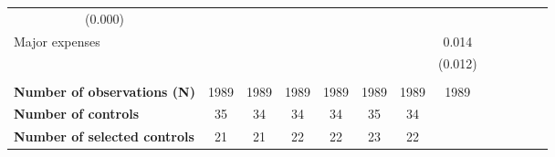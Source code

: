 \begin{center}
\begin{table}[th]
{\begin{tabular}{lcccccccccccc}
  \multicolumn{1}{c}{(0.000)} \\
\multicolumn{1}{l}{Major expenses} &
  \multicolumn{1}{c}{} &
  \multicolumn{1}{c}{} &
  \multicolumn{1}{c}{} &
  \multicolumn{1}{c}{} &
  \multicolumn{1}{c}{} &
  \multicolumn{1}{c}{} &
  \multicolumn{1}{c}{0.014} \\
\multicolumn{1}{l}{} &
  \multicolumn{1}{c}{} &
  \multicolumn{1}{c}{} &
  \multicolumn{1}{c}{} &
  \multicolumn{1}{c}{} &
  \multicolumn{1}{c}{} &
  \multicolumn{1}{c}{} &
  \multicolumn{1}{c}{(0.012)} \\
\\
\multicolumn{1}{l}{{\bf Number of observations (N)}} &
  \multicolumn{1}{c}{1989} &
  \multicolumn{1}{c}{1989} &
  \multicolumn{1}{c}{1989} &
  \multicolumn{1}{c}{1989} &
  \multicolumn{1}{c}{1989} &
  \multicolumn{1}{c}{1989} &
  \multicolumn{1}{c}{1989} \\
\multicolumn{1}{l}{{\bf Number of controls}} &
  \multicolumn{1}{c}{35} &
  \multicolumn{1}{c}{34} &
  \multicolumn{1}{c}{34} &
  \multicolumn{1}{c}{34} &
  \multicolumn{1}{c}{35} &
  \multicolumn{1}{c}{34} &
  \multicolumn{1}{c}{} \\
\multicolumn{1}{l}{{\bf Number of selected controls}} &
  \multicolumn{1}{c}{21} &
  \multicolumn{1}{c}{21} &
  \multicolumn{1}{c}{22} &
  \multicolumn{1}{c}{22} &
  \multicolumn{1}{c}{23} &
  \multicolumn{1}{c}{22} &
  \multicolumn{1}{c}{} \\
\hline
\hline
\end{tabular}
}
\end{table}
\end{center}
